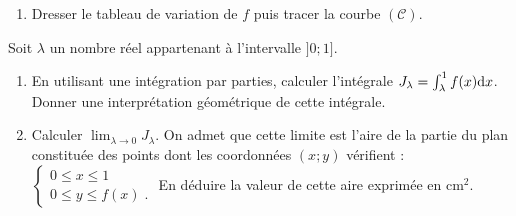 \begin{exo}
\begin{description}
\begin{enumerate}
                        \item Dresser le tableau de variation de $f$ puis tracer la courbe $(\mathscr{C})$.
                  \end{enumerate}
            \item[Partie C :]
                  Soit $\lambda$ un nombre r\'eel appartenant \`a l'intervalle $]0 ; 1]$.
                  \begin{enumerate}
                        \item En utilisant une int\'egration par parties, calculer l'int\'egrale
                              $J_\lambda = \int_{\lambda}^{1} f(x) \mathrm{d}x$.
                              Donner une interpr\'etation g\'eom\'etrique de cette int\'egrale.
                        \item Calculer $\displaystyle{\lim_{\lambda \rightarrow 0} J_\lambda}$.
                              On admet que cette limite est l'aire de la partie du plan constitu\'ee
                              des points dont les coordonn\'ees $(x ; y)$ v\'erifient : 
                              $
                              \left\lbrace
                                    \begin{array}{l}
                                          0 \leq x \leq 1    \\
                                          0 \leq y \leq f(x) \;.
                                    \end{array}
                              \right.
                              $
                              En d\'eduire la valeur de cette aire exprim\'ee en $\mathrm{cm}^2$.
                  \end{enumerate}
      \end{description}
\end{exo}
